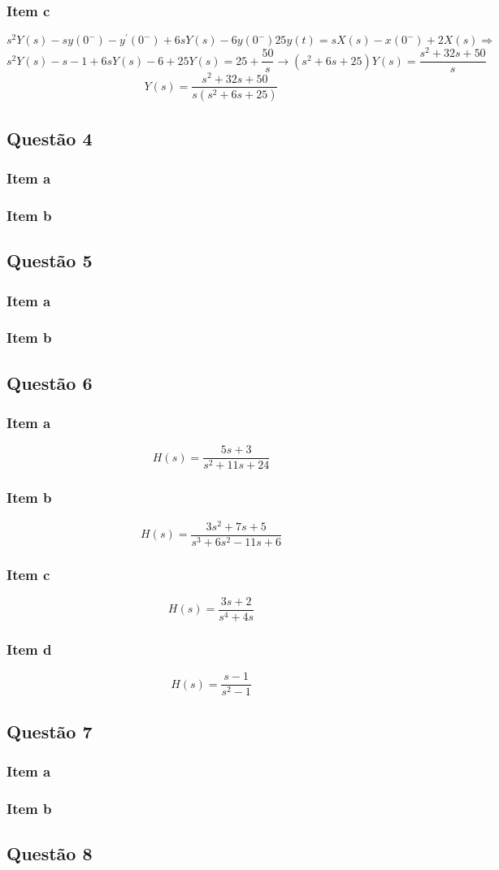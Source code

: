 \documentclass[a4paper, 12pt]{article}
\begin{document}
    \subsubsection{Item c}     
    \[s^{2}Y(s) - sy(0^{-}) - y^{'}(0^{-}) + 6sY(s) - 6y(0^{-}) 25y(t) = sX(s) - x(0^{-}) + 2X(s) \Rightarrow\]  
    \[s^{2}Y(s) - s - 1 + 6sY(s) -6 +25Y(s) = 25+\frac{50}{s}\rightarrow (s^{2} + 6s +25)Y(s) = \frac{s^{2}+32s+50}{s}\]      
    \[Y(s) = \frac{s^{2}+32s+50}{s(s^{2} + 6s +25)}\]             
    \subsection{Quest\~{a}o 4}
    \subsubsection{Item a} 
    \subsubsection{Item b}     
    \subsection{Quest\~{a}o 5}
    \subsubsection{Item a} 
    \subsubsection{Item b}     
    \subsection{Quest\~{a}o 6}
    \subsubsection{Item a} 
    \[H(s) = \frac{5s+3}{s^{2} + 11s +24}\]  
    \subsubsection{Item b} 
    \[H(s) = \frac{3s^{2} + 7s+5}{s^{3} +  6s^{2} - 11s +6}\]  
    \subsubsection{Item c} 
    \[H(s) = \frac{3s +2}{s^{4} + 4s}\]  
	\subsubsection{Item d} 
	\[H(s) = \frac{s -1}{s^{2} - 1}\]     
    \subsection{Quest\~{a}o 7}
    \subsubsection{Item a} 
    \subsubsection{Item b}     
    \subsection{Quest\~{a}o 8}    
                            
\end{document}
